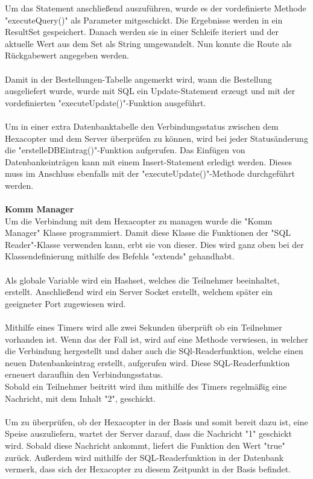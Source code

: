 Um das Statement anschließend auszuführen, wurde es der vordefinierte Methode "executeQuery()" als Parameter mitgeschickt.
Die Ergebnisse werden in ein ResultSet gespeichert. Danach werden sie in einer Schleife iteriert und der aktuelle Wert aus dem Set als String umgewandelt. Nun konnte die Route als Rückgabewert angegeben werden. 
\\ \\
Damit in der Bestellungen-Tabelle angemerkt wird, wann die Bestellung ausgeliefert wurde, wurde mit SQL ein Update-Statement erzeugt und mit der vordefinierten "executeUpdate()"-Funktion ausgeführt.
\\ \\
Um in einer extra Datenbanktabelle den Verbindungsstatus zwischen dem Hexacopter und dem Server überprüfen zu können, wird bei jeder Statusänderung die "erstelleDBEintrag()"-Funktion aufgerufen. Das Einfügen von Datenbankeinträgen kann mit einem Insert-Statement erledigt werden. Dieses muss im Anschluss ebenfalls mit der "executeUpdate()"-Methode durchgeführt werden.
\\ \\
\textbf{Komm Manager}\\
Um die Verbindung mit dem Hexacopter zu managen wurde die "Komm Manager" Klasse programmiert.
Damit diese Klasse die Funktionen der "SQL Reader"-Klasse verwenden kann, erbt sie von dieser. Dies wird ganz oben bei der Klassendefinierung mithilfe des Befehls "extends" gehandhabt.
\\ \\
Als globale Variable wird ein Hashset, welches die Teilnehmer beeinhaltet, erstellt.
Anschließend wird ein Server Socket erstellt, welchem später ein geeigneter Port zugewiesen wird.
\\ \\
Mithilfe eines Timers wird alle zwei Sekunden überprüft ob ein Teilnehmer vorhanden ist. Wenn das der Fall ist, wird auf eine Methode verwiesen, in welcher die Verbindung hergestellt und daher auch die SQl-Readerfunktion, welche einen neuen Datenbankeintrag erstellt, aufgerufen wird. Diese SQL-Readerfunktion erneuert daraufhin den Verbindungsstatus. 
\\
Sobald ein Teilnehmer beitritt wird ihm mithilfe des Timers regelmäßig eine Nachricht, mit dem Inhalt "2", geschickt.
\\ \\
Um zu überprüfen, ob der Hexacopter in der Basis und somit bereit dazu ist, eine Speise auszuliefern, wartet der Server darauf, dass die Nachricht "1" geschickt wird. Sobald diese Nachricht ankommt, liefert die Funktion den Wert "true" zurück. Außerdem wird mithilfe der SQL-Readerfunktion in der Datenbank vermerk, dass sich der Hexacopter zu diesem Zeitpunkt in der Basis befindet.

